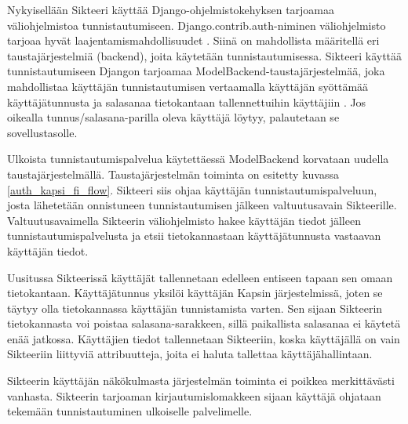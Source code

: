 Nykyisellään Sikteeri käyttää Django-ohjelmistokehyksen tarjoamaa väliohjelmistoa tunnistautumiseen. Django.contrib.auth-niminen väliohjelmisto tarjoaa hyvät laajentamismahdollisuudet \cite{django_auth}. Siinä on mahdollista määritellä eri taustajärjestelmiä (backend), joita käytetään tunnistautumisessa. Sikteeri käyttää tunnistautumiseen Djangon tarjoamaa ModelBackend-taustajärjestelmää, joka mahdollistaa käyttäjän tunnistautumisen vertaamalla käyttäjän syöttämää käyttäjätunnusta ja salasanaa tietokantaan tallennettuihin käyttäjiin \cite{django_auth}. Jos oikealla tunnus/salasana-parilla oleva käyttäjä löytyy, palautetaan se sovellustasolle.

Ulkoista tunnistautumispalvelua käytettäessä ModelBackend korvataan uudella taustajärjestelmällä. Taustajärjestelmän toiminta on esitetty kuvassa \ref{auth_kapsi_fi_flow}. Sikteeri siis ohjaa käyttäjän tunnistautumispalveluun, josta lähetetään onnistuneen tunnistautumisen jälkeen valtuutusavain Sikteerille. Valtuutusavaimella Sikteerin väliohjelmisto hakee käyttäjän tiedot jälleen tunnistautumispalvelusta ja etsii tietokannastaan käyttäjätunnusta vastaavan käyttäjän tiedot.

Uusitussa Sikteerissä käyttäjät tallennetaan edelleen entiseen tapaan sen omaan tietokantaan. Käyttäjätunnus yksilöi käyttäjän Kapsin järjestelmissä, joten se täytyy olla tietokannassa käyttäjän tunnistamista varten. Sen sijaan Sikteerin tietokannasta voi poistaa salasana-sarakkeen, sillä paikallista salasanaa ei käytetä enää jatkossa. Käyttäjien tiedot tallennetaan Sikteeriin, koska käyttäjällä on vain Sikteeriin liittyviä attribuutteja, joita ei haluta tallettaa käyttäjähallintaan.

Sikteerin käyttäjän näkökulmasta järjestelmän toiminta ei poikkea merkittävästi vanhasta. Sikteerin tarjoaman kirjautumislomakkeen sijaan käyttäjä ohjataan tekemään tunnistautuminen ulkoiselle palvelimelle.
